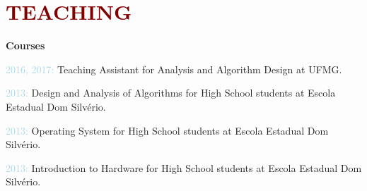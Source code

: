 \section*{\textcolor{maroon}{\normalsize TEACHING}} 

\textbf{Courses}

\begin{innerlist}[-]

\item \textcolor{lightblue}{2016, 2017:}  Teaching Assistant for Analysis and Algorithm Design at UFMG.
\item \textcolor{lightblue}{2013:} Design and Analysis of Algorithms for High School students at Escola Estadual Dom Silvério.
\item \textcolor{lightblue}{2013:} Operating System for High School students at Escola Estadual Dom Silvério.
\item \textcolor{lightblue}{2013:} Introduction to Hardware for High School students at Escola Estadual Dom Silvério.

\end{innerlist}



